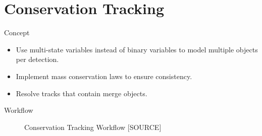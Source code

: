 \section{Conservation Tracking}

\begin{frame}{Concept}
    \begin{itemize}
          \item Use multi-state variables instead of binary variables to model multiple objects per
        detection.
          \item Implement mass conservation laws to ensure consistency.
          \item Resolve tracks that contain merge objects.
    \end{itemize}
\end{frame}

\begin{frame}{Workflow}
    \begin{figure}
        \centering
        \caption{Conservation Tracking Workflow [SOURCE]}
        \label{fig:conservation-pipeline}
    \end{figure}
\end{frame}

